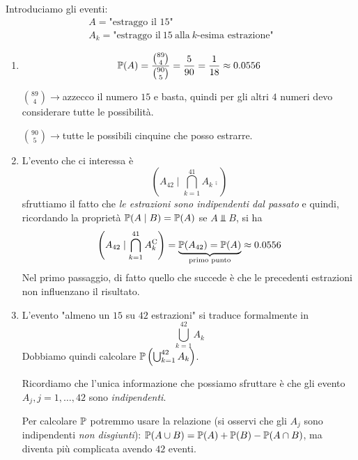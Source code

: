 Introduciamo gli eventi:
\begin{gather*}
	A=\text{"estraggo il 15"}\\
	A_{k} =\text{"estraggo il} \ 15\ \text{alla} \ k\text{-esima estrazione"}
\end{gather*}
\begin{enumerate}
	\item
	\begin{equation*}
		\mathbb{P}(A) =\frac{\binom{89}{4}}{\binom{90}{5}} =\frac{5}{90} =\frac{1}{18} \approx 0.0556
	\end{equation*}

	$\binom{89}{4}\rightarrow $azzecco il numero $15$ e basta, quindi per gli altri $4$ numeri devo considerare tutte le possibilità.

	$\binom{90}{5}\rightarrow $tutte le possibili cinquine che posso estrarre.
	\item L'evento che ci interessa è
	\begin{equation*}
		\left(A_{42} \mid \bigcap_{k=1}^{41} A_{k}\comp\right)
	\end{equation*}
	sfruttiamo il fatto che \textit{le estrazioni sono indipendenti dal passato} e quindi, ricordando la proprietà $\mathbb{P}(A\mid B) =\mathbb{P}(A)$ se $A\Bot B$, si ha
	\begin{equation*}
		\left(A_{42} \mid\bigcap_{k=1}^{41} A_{k}^{\mathrm{C}}\right) =\underbrace{\mathbb{P}(A_{42}) =\mathbb{P}(A)}_{\text{primo punto}} \approx 0.0556
	\end{equation*}
	Nel primo passaggio, di fatto quello che succede è che le precedenti estrazioni non influenzano il risultato.
	\item L'evento "almeno un $15$ su $42$ estrazioni" si traduce formalmente in
	\begin{equation*}
		\bigcup_{k=1}^{42} A_{k}
	\end{equation*}
	Dobbiamo quindi calcolare $\mathbb{P}\left(\bigcup_{k=1}^{42} A_{k}\right)$.

	Ricordiamo che l'unica informazione che possiamo sfruttare è che gli evento $A_{j} ,j=1,\dots,42$ sono \textit{indipendenti}.

	Per calcolare $\mathbb{P}$ potremmo usare la relazione (si osservi che gli $A_{j}$ sono indipendenti \textit{non disgiunti}): $\mathbb{P}(A\cup B) =\mathbb{P}(A) +\mathbb{P}(B) -\mathbb{P}(A\cap B)$, ma diventa più complicata avendo $42$ eventi.


\end{enumerate}
